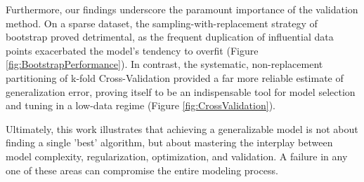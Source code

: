 \documentclass[twocolumn,aps]{revtex4}
\begin{document}
Furthermore, our findings underscore the paramount importance of the validation method. On a sparse dataset, the sampling-with-replacement strategy of bootstrap proved detrimental, as the frequent duplication of influential data points exacerbated the model's tendency to overfit (Figure \ref{fig:BootstrapPerformance}). In contrast, the systematic, non-replacement partitioning of k-fold Cross-Validation provided a far more reliable estimate of generalization error, proving itself to be an indispensable tool for model selection and tuning in a low-data regime (Figure \ref{fig:CrossValidation}).

Ultimately, this work illustrates that achieving a generalizable model is not about finding a single 'best' algorithm, but about mastering the interplay between model complexity, regularization, optimization, and validation. A failure in any one of these areas can compromise the entire modeling process.



\end{document}
